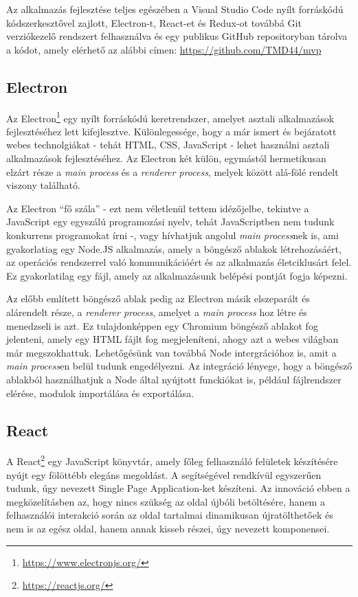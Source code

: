 Az alkalmazás fejlesztése teljes egészében a Visual Studio Code nyílt forráskódú kódszerkesztővel zajlott, Electron-t, React-et és Redux-ot továbbá Git verziókezelő rendszert felhasználva és egy publikus GitHub repositoryban tárolva a kódot, amely elérhető az alábbi címen: \url{https://github.com/TMD44/mvp}

\subsection{Electron}
Az Electron\footnote{\url{https://www.electronjs.org/}} egy nyílt forráskódú keretrendszer, amelyet asztali alkalmazások fejlesztéséhez lett kifejlesztve. Különlegessége, hogy a már ismert és bejáratott webes technolgiákat - tehát HTML, CSS, JavaScript - lehet használni asztali alkalmazások fejlesztéséhez. Az Electron két külön, egymástól hermetikusan elzárt része a {\it main process} és a {\it renderer process}, melyek között alá-fölé rendelt viszony található.

Az Electron ``fő szála'' - ezt nem véletlenül tettem idézőjelbe, tekintve a JavaScript egy egyszálú programozási nyelv, tehát JavaScriptben nem tudunk konkurrens programokat írni -, vagy hívhatjuk angolul {\it main process}nek is, ami gyakorlatiag egy Node.JS alkalmazás, amely a böngésző ablakok létrehozásáért, az operációs rendszerrel való kommunikációért és az alkalmazás életciklusárt felel. Ez gyakorlatilag egy fájl, amely az alkalmazásunk belépési pontját fogja képezni.

Az előbb említett böngésző ablak pedig az Electron másik elszeparált és alárendelt része, a {\it renderer process}, amelyet a {\it main process} hoz létre és menedzseli is azt. Ez tulajdonképpen egy Chromium böngésző ablakot fog jelenteni, amely egy HTML fájlt fog megjeleníteni, ahogy azt a webes világban már megszokhattuk. Lehetőgésünk van továbbá Node intergrációhoz is, amit a {\it main process}en belül tudunk engedélyezni. Az integráció lényege, hogy a böngésző ablakból használhatjuk a Node által nyújtott funckiókat is, például fájlrendszer elérése, modulok importálása és exportálása.

\subsection{React}
A React\footnote{\url{https://reactjs.org/}} egy JavaScript könyvtár, amely főleg felhasználó felületek készítésére nyújt egy fölöttébb elegáns megoldást. A segítségével rendkívül egyszerűen tudunk, úgy nevezett Single Page Application-ket készíteni. Az innováció ebben a megközelításben az, hogy nincs szükség az oldal újbóli betöltésére, hanem a felhasználói interakció során az oldal tartalmai dinamikusan újratölthetőek és nem is az egész oldal, hanem annak kisseb részei, úgy nevezett komponensei.

